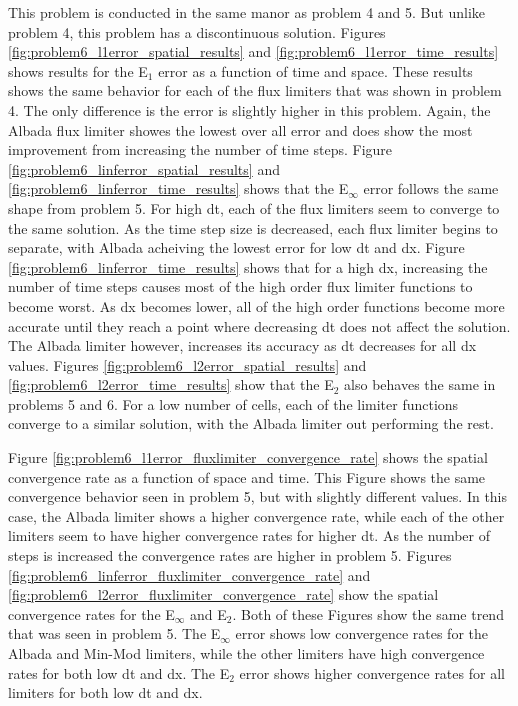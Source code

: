 This problem is conducted in the same manor as problem 4 and 5. But unlike problem 4, this problem has a discontinuous solution. Figures \ref{fig:problem6_l1error_spatial_results} and  \ref{fig:problem6_l1error_time_results} shows results for the E${}_{1}$ error as a function of time and space. These results shows the same behavior for each of the flux limiters that was shown in problem 4. The only difference is the error is slightly higher in this problem. Again, the Albada flux limiter showes the lowest over all error and does show the most improvement from increasing the number of time steps. Figure \ref{fig:problem6_linferror_spatial_results} and \ref{fig:problem6_linferror_time_results} shows that the E${}_{\infty}$ error follows the same shape from problem 5. For high dt, each of the flux limiters seem to converge to the same solution. As the time step size is decreased, each flux limiter begins to separate, with Albada acheiving the lowest error for low dt and dx. Figure \ref{fig:problem6_linferror_time_results} shows that for a high dx, increasing the number of time steps causes most of the high order flux limiter functions to become worst. As dx becomes lower, all of the high order functions become more accurate until they reach a point where decreasing dt does not affect the solution. The Albada limiter however, increases its accuracy as dt decreases for all dx values. Figures \ref{fig:problem6_l2error_spatial_results} and \ref{fig:problem6_l2error_time_results} show that the E${}_{2}$ also behaves the same in problems 5 and 6. For a low number of cells, each of the limiter functions converge to a similar solution, with the Albada limiter out performing the rest. 

Figure \ref{fig:problem6_l1error_fluxlimiter_convergence_rate} shows the spatial convergence rate as a function of space and time. This Figure shows the same convergence behavior seen in problem 5, but with slightly different values. In this case, the Albada limiter shows a higher convergence rate, while each of the other limiters seem to have higher convergence rates for higher dt. As the number of steps is increased the convergence rates are higher in problem 5. Figures \ref{fig:problem6_linferror_fluxlimiter_convergence_rate} and \ref{fig:problem6_l2error_fluxlimiter_convergence_rate} show the spatial convergence rates for the E${}_{\infty}$ and E${}_{2}$. Both of these Figures show the same trend that was seen in problem 5. The E${}_{\infty}$ error shows low convergence rates for the Albada and Min-Mod limiters, while the other limiters have high convergence rates for both low dt and dx. The E${}_{2}$ error shows higher convergence rates for all limiters for both low dt and dx. 

